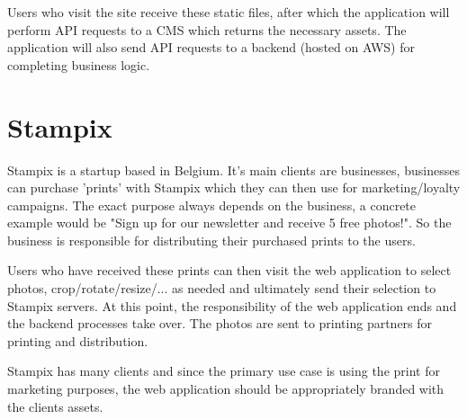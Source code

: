 Users who visit the site receive these static files, after which the application will perform API requests to a CMS which returns the necessary assets. The application will also send API requests to a backend (hosted on AWS) for completing business logic.


\section{Stampix}

Stampix is a startup based in Belgium. It's main clients are businesses, businesses can purchase 'prints' with Stampix which they can then use for marketing/loyalty campaigns. 
The exact purpose always depends on the business, a concrete example would be "Sign up for our newsletter and receive 5 free photos!". So the business is responsible for distributing their purchased prints to the users.

Users who have received these prints can then visit the web application to select photos, crop/rotate/resize/... as needed and ultimately send their selection to Stampix servers. 
At this point, the responsibility of the web application ends and the backend processes take over. The photos are sent to printing partners for printing and distribution.

Stampix has many clients and since the primary use case is using the print for marketing purposes, the web application should be appropriately branded with the clients assets.
